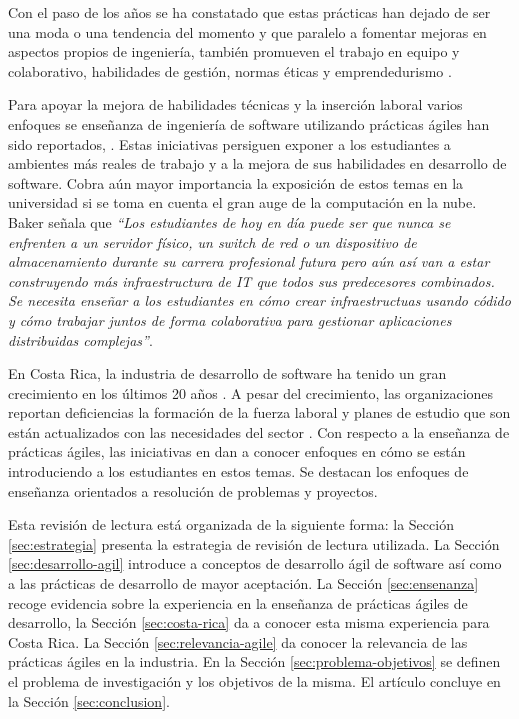 \documentclass[journal]{IEEEtran}
\begin{document}
Con el paso de los años se ha constatado que estas prácticas han dejado de ser una moda o una tendencia del momento y que paralelo a fomentar mejoras en aspectos propios de ingeniería, también promueven el trabajo en equipo y colaborativo, habilidades de gestión, normas éticas y emprendedurismo \cite{hazzan-dubinsky, hickey-salas}. 

Para apoyar la mejora de habilidades técnicas y la inserción laboral varios enfoques se enseñanza de ingeniería de software utilizando prácticas ágiles han sido reportados, \cite{ding-yousef-yue, steghoger-et-al, scharlau, schroeder-et-al, cubric, haaranen-lehtinen, kropp-meier-2}. Estas iniciativas persiguen exponer a los estudiantes a ambientes más reales de trabajo y a la mejora de sus habilidades en desarrollo de software. Cobra aún mayor importancia la exposición de estos temas en la universidad si se toma en cuenta el gran auge de la computación en la nube. Baker \cite{advance-it} señala que \emph{``Los estudiantes de hoy en día puede ser que nunca se enfrenten a un servidor físico, un switch de red o un dispositivo de almacenamiento durante su carrera profesional futura pero aún así van a estar construyendo más infraestructura de IT que todos sus predecesores combinados. Se necesita enseñar a los estudiantes en cómo crear infraestructuas usando códido y cómo trabajar juntos de forma colaborativa para gestionar aplicaciones distribuidas complejas''}. 


En Costa Rica, la industria de desarrollo de software ha tenido un gran crecimiento en los últimos 20 años \cite{cenfotec-2, prosic}. A pesar del crecimiento, las organizaciones reportan deficiencias la formación de la fuerza laboral y planes de estudio que son están actualizados con las necesidades del sector \cite{prosic}. Con respecto a la enseñanza de prácticas ágiles, las iniciativas en \cite{trejos-1, salazar, mora-et-al-1, mora-et-al-2} dan a conocer enfoques en cómo se están introduciendo a los estudiantes en estos temas. Se destacan los enfoques de enseñanza orientados a resolución de problemas y proyectos.

Esta revisión de lectura está organizada de la siguiente forma: la Sección \ref{sec:estrategia} presenta la estrategia de revisión de lectura utilizada. La Sección \ref{sec:desarrollo-agil} introduce a conceptos de desarrollo ágil de software así como a las prácticas de desarrollo de mayor aceptación. La Sección \ref{sec:ensenanza} recoge evidencia sobre la experiencia en la enseñanza de prácticas ágiles de desarrollo, la Sección \ref{sec:costa-rica} da a conocer esta misma experiencia para Costa Rica. La Sección \ref{sec:relevancia-agile} da conocer la relevancia de las prácticas ágiles en la industria. En la Sección \ref{sec:problema-objetivos} se definen el problema de investigación y los objetivos de la misma. El artículo concluye en la Sección \ref{sec:conclusion}.
\end{document}
